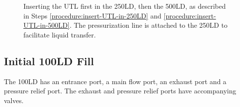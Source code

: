 \begin{figure}[htbp!]
\begin{minipage}{.58\textwidth}
 \end{minipage}
 \caption{Inserting the UTL first in the 250LD, then the 500LD, as described in Steps \ref{procedure:insert-UTL-in-250LD} and \ref{procedure:insert-UTL-in-500LD}.  The pressurization line is attached to the 250LD to facilitate liquid transfer.}
 \label{fig:500LDfill-03-04-insert-UTL-in-250LD-and-500LD}
 \end{figure}
 
\pagebreak

\subsection{Initial 100LD Fill}

The 100LD has an entrance port, a main flow port, an exhaust port and a pressure relief port.  The exhaust and pressure relief ports have accompanying valves.
 
